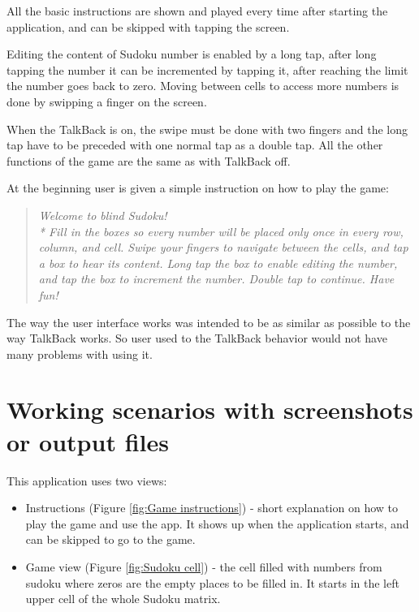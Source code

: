 \documentclass[a4paper,twoside,12pt]{book}
\begin{document}
\par 
All the basic instructions are shown and played every time after starting the application, and can be skipped with tapping the screen. 
\par
Editing the content of Sudoku number is enabled by a long tap, after long tapping the number it can be incremented by tapping it, after reaching the limit the number goes back to zero. Moving between cells to access more numbers is done by swipping a finger on the screen.
\par
When the TalkBack is on, the swipe must be done with two fingers and the long tap have to be preceded with one normal tap as a double tap. All the other functions of the game are the same as with TalkBack off.
\par 
At the beginning user is given a simple instruction on how to play the game:
\begin{quote}
\textit{
Welcome to blind Sudoku!\\*
Fill in the boxes so every number will be placed only
once in every row, column, and cell. Swipe your fingers to navigate between the cells,
and tap a box to hear its content. Long tap the box to enable editing the number, and tap
the box to increment the number. Double tap to continue. Have fun!
}
\end{quote}
\par The way the user interface works was intended to be as similar as possible to the way TalkBack works. So user used to the TalkBack behavior would not have many problems with using it.




\section {Working scenarios with screenshots or output files}

\par This application uses two views:
\begin{itemize}
\item  Instructions (Figure \ref{fig:Game instructions}) - short explanation on how to play the game and use the app. It shows up when the application starts, and can be skipped to go to the game.
\item  Game view (Figure \ref{fig:Sudoku cell}) - the cell filled with numbers from sudoku where zeros are the empty places to be filled in. It starts in the left upper cell of the whole Sudoku matrix.
\end{itemize}
\end{document}
